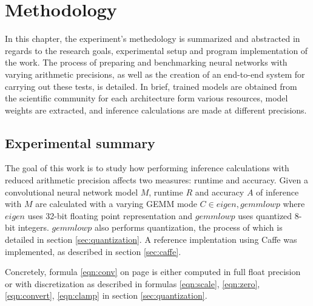 \chapter{Methodology}

In this chapter, the experiment's methedology is summarized and abstracted in regards to the research goals, experimental setup and program implementation of the work. The process of preparing and benchmarking neural networks with varying arithmetic precisions, as well as the creation of an end-to-end system for carrying out these tests, is detailed. In brief, trained models are obtained from the scientific community for each architecture form various resources, model weights are extracted, and inference calculations are made at different precisions.

\section{Experimental summary}
The goal of this work is to study how performing inference calculations with reduced arithmetic precision affects two measures: runtime and accuracy. Given a convolutional neural network model $M$, runtime $R$ and accuracy $A$ of inference with $M$ are calculated with a varying GEMM mode $C \in{eigen, gemmlowp}$ where $eigen$ \cite{eigen} uses 32-bit floating point representation and $gemmlowp$ \cite{gemmlowp} uses quantized 8-bit integers. $gemmlowp$ also performs quantization, the process of which is detailed in section \ref{sec:quantization}. A reference implentation using Caffe \cite{caffe} was implemented, as described in section \ref{sec:caffe}.

Concretely, formula \ref{eqn:conv} on page \pageref{eqn:conv} is either computed in full float precision or with discretization as described in formulas \ref{eqn:scale}, \ref{eqn:zero}, \ref{eqn:convert}, \ref{eqn:clamp} in section \ref{sec:quantization}.

